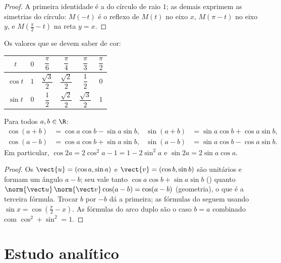 \begin{proof}
A primeira identidade é a  do círculo de raio $1$; as demais
exprimem as simetrias do círculo: $M(-t)$ é o reflexo de $M(t)$ no eixo
$x$, $M(\pi - t)$ no eixo $y$, e $M(\frac\pi2 - t)$ na reta $y = x$.
\end{proof}

Os valores que se devem saber de cor:
\begin{center}
\begin{tabular}{c|ccccc}
$t$ & $0$ & $\dfrac{\pi}{6}$ & $\dfrac{\pi}{4}$ & $\dfrac{\pi}{3}$ & $\dfrac{\pi}{2}$\\[6pt]
\hline\rule{0pt}{14pt}%
$\cos t$ & $1$ & $\dfrac{\sqrt3}{2}$ & $\dfrac{\sqrt2}{2}$ & $\dfrac12$ & $0$\\[6pt]
$\sin t$ & $0$ & $\dfrac12$ & $\dfrac{\sqrt2}{2}$ & $\dfrac{\sqrt3}{2}$ & $1$
\end{tabular}
\end{center}

\begin{proposition}\label{prop:g12:trigo:addition}
Para todos $a, b \in \R$:
\begin{align*}
\cos(a+b) &= \cos a \cos b - \sin a \sin b, &
\sin(a+b) &= \sin a \cos b + \cos a \sin b,\\
\cos(a-b) &= \cos a \cos b + \sin a \sin b, &
\sin(a-b) &= \sin a \cos b - \cos a \sin b.
\end{align*}
Em particular, $\cos 2a = 2\cos^2 a - 1 = 1 - 2\sin^2 a$ e
$\sin 2a = 2 \sin a \cos a$.
\end{proposition}

\begin{proof}
Os  $\vect{u} = (\cos a, \sin a)$ e $\vect{v} = (\cos b, \sin b)$
são unitários e formam um ângulo $a - b$; seu  vale tanto
$\cos a\cos b + \sin a \sin b$ () quanto
$\norm{\vect u}\,\norm{\vect v}\cos(a-b) = \cos(a - b)$ (geometria), o que
é a terceira fórmula. Trocar $b$ por $-b$ dá a primeira; as fórmulas do
 seguem usando $\sin x = \cos(\frac\pi2 - x)$. As fórmulas do arco
duplo são o caso $b = a$ combinado com $\cos^2 + \sin^2 = 1$.
\end{proof}

\section{Estudo analítico}


